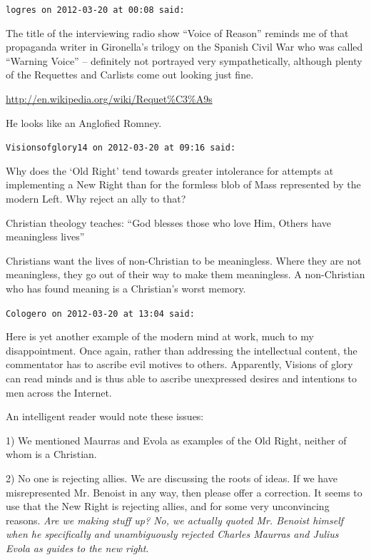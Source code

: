 \begin{footnotesize}
\begin{sffamily}
\texttt{logres on 2012-03-20 at 00:08 said:}

The title of the interviewing radio show ``Voice of Reason'' reminds me of that propaganda writer in Gironella's trilogy on the Spanish Civil War who was called ``Warning Voice'' -- definitely not portrayed very sympathetically, although plenty of the Requettes and Carlists come out looking just fine.

\url{http://en.wikipedia.org/wiki/Requet\%C3\%A9s}

He looks like an Anglofied Romney.

\hfill

\texttt{Visionsofglory14 on 2012-03-20 at 09:16 said:}

Why does the `Old Right' tend towards greater intolerance for attempts at implementing a New Right than for the formless blob of Mass represented by the modern Left. Why reject an ally to that?

Christian theology teaches: ``God blesses those who love Him, Others have meaningless lives''

Christians want the lives of non-Christian to be meaningless. Where they are not meaningless, they go out of their way to make them meaningless. A non-Christian who has found meaning is a Christian's worst memory.

\hfill

\texttt{Cologero on 2012-03-20 at 13:04 said:}

Here is yet another example of the modern mind at work, much to my disappointment. Once again, rather than addressing the intellectual content, the commentator has to ascribe evil motives to others. Apparently, Visions of glory can read minds and is thus able to ascribe unexpressed desires and intentions to men across the Internet.

An intelligent reader would note these issues:

1) We mentioned Maurras and Evola as examples of the Old Right, neither of whom is a Christian.

2) No one is rejecting allies. We are discussing the roots of ideas. If we have misrepresented Mr. Benoist in any way, then please offer a correction. It seems to use that the New Right is rejecting allies, and for some very unconvincing reasons. \emph{Are we making stuff up? No, we actually quoted Mr. Benoist himself when he specifically and unambiguously rejected Charles Maurras and Julius Evola as guides to the new right}.


\end{sffamily}
\end{footnotesize}
